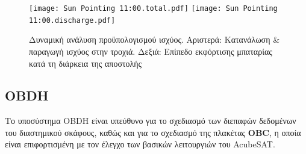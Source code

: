 \documentclass[a4paper,nobib]{tufte-book}
\begin{document}
\FloatBarrier

\begin{figure}[h]
	\texttt{[image: Sun Pointing 11:00.total.pdf]}
	\hfill
	\texttt{[image: Sun Pointing 11:00.discharge.pdf]}

	\caption[Δυναμική ανάλυση προϋπολογισμού ισχύος]{Δυναμική ανάλυση προϋπολογισμού ισχύος. Αριστερά: Κατανάλωση \& παραγωγή ισχύος στην τροχιά. Δεξιά: Επίπεδο εκφόρτισης μπαταρίας κατά τη διάρκεια της αποστολής}
\end{figure}

\subsection{\acf{OBDH}}
\label{sec:obdh}

Το υποσύστημα \ac{OBDH} είναι υπεύθυνο για το σχεδιασμό των διεπαφών δεδομένων του διαστημικού σκάφους, καθώς και για το σχεδιασμό της πλακέτας \textbf{\acf{OBC}}, η οποία είναι επιφορτισμένη με τον έλεγχο των βασικών λειτουργιών του AcubeSAT. \autocite{DDJF_OBDH}
\end{document}
